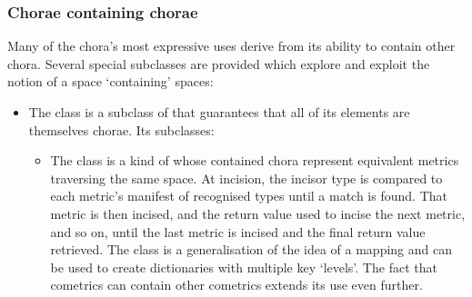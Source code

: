 \documentclass[letterpaper,10pt,english]{jupyterBook}
\begin{document}
\subsubsection{Chorae containing chorae}
\label{\detokenize{content/chapter_03_everest/implementation:chorae-containing-chorae}}
\sphinxAtStartPar
Many of the chora’s most expressive uses derive from its ability to contain other chora. Several special subclasses are provided which explore and exploit the notion of a space ‘containing’ spaces:
\begin{itemize}
\item {} 
\sphinxAtStartPar
The  class is a subclass of  that guarantees that all of its elements are themselves chorae. Its subclasses:
\begin{itemize}
\item {} 
\sphinxAtStartPar
The  class is a kind of   whose contained chora represent equivalent metrics traversing the same space. At incision, the incisor type is compared to each metric’s manifest of recognised types until a match is found. That metric is then incised, and the return value used to incise the next metric, and so on, until the last metric is incised and the final return value retrieved. The  class is a generalisation of the idea of a mapping and can be used to create dictionaries with multiple key ‘levels’. The fact that cometrics can contain other cometrics extends its use even further.


\end{itemize}
\end{itemize}
\end{document}
